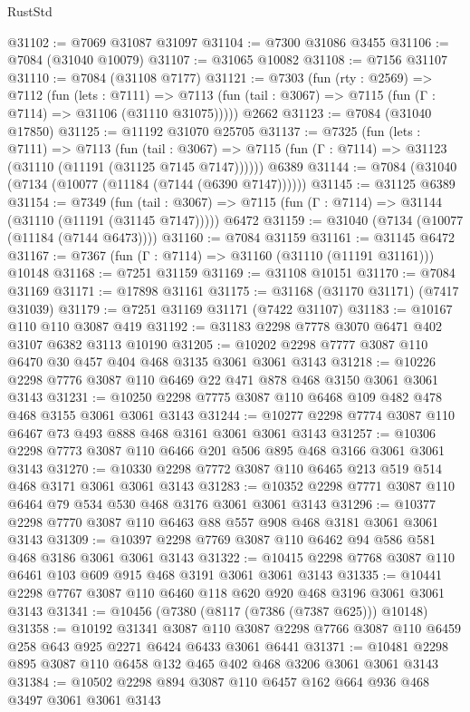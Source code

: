 \begin{lexlean}{RustStd}
\begin{coremodule}
@31102 := @7069 @31087 @31097
@31104 := @7300 @31086 @3455
@31106 := @7084 (@31040 @10079)
@31107 := @31065 @10082
@31108 := @7156 @31107
@31110 := @7084 (@31108 @7177)
@31121 := @7303
    (fun (rty : @2569) =>
    @7112
      (fun (lets : @7111) =>
      @7113 (fun (tail : @3067) => @7115 (fun (Γ : @7114) => @31106 (@31110 @31075)))))
    @2662
@31123 := @7084 (@31040 @17850)
@31125 := @11192 @31070 @25705
@31137 := @7325
    (fun (lets : @7111) =>
    @7113
      (fun (tail : @3067) =>
      @7115 (fun (Γ : @7114) => @31123 (@31110 (@11191 (@31125 @7145 @7147))))))
    @6389
@31144 := @7084 (@31040 (@7134 (@10077 (@11184 (@7144 (@6390 @7147))))))
@31145 := @31125 @6389
@31154 := @7349
    (fun (tail : @3067) => @7115 (fun (Γ : @7114) => @31144 (@31110 (@11191 (@31145 @7147)))))
    @6472
@31159 := @31040 (@7134 (@10077 (@11184 (@7144 @6473))))
@31160 := @7084 @31159
@31161 := @31145 @6472
@31167 := @7367 (fun (Γ : @7114) => @31160 (@31110 (@11191 @31161))) @10148
@31168 := @7251 @31159
@31169 := @31108 @10151
@31170 := @7084 @31169
@31171 := @17898 @31161
@31175 := @31168 (@31170 @31171) (@7417 @31039)
@31179 := @7251 @31169 @31171 (@7422 @31107)
@31183 := @10167 @110 @110 @3087 @419
@31192 := @31183 @2298 @7778 @3070 @6471 @402 @3107 @6382 @3113 @10190
@31205 := @10202 @2298 @7777 @3087 @110 @6470 @30 @457 @404 @468 @3135 @3061 @3061 @3143
@31218 := @10226 @2298 @7776 @3087 @110 @6469 @22 @471 @878 @468 @3150 @3061 @3061 @3143
@31231 := @10250 @2298 @7775 @3087 @110 @6468 @109 @482 @478 @468 @3155 @3061 @3061 @3143
@31244 := @10277 @2298 @7774 @3087 @110 @6467 @73 @493 @888 @468 @3161 @3061 @3061 @3143
@31257 := @10306 @2298 @7773 @3087 @110 @6466 @201 @506 @895 @468 @3166 @3061 @3061 @3143
@31270 := @10330 @2298 @7772 @3087 @110 @6465 @213 @519 @514 @468 @3171 @3061 @3061 @3143
@31283 := @10352 @2298 @7771 @3087 @110 @6464 @79 @534 @530 @468 @3176 @3061 @3061 @3143
@31296 := @10377 @2298 @7770 @3087 @110 @6463 @88 @557 @908 @468 @3181 @3061 @3061 @3143
@31309 := @10397 @2298 @7769 @3087 @110 @6462 @94 @586 @581 @468 @3186 @3061 @3061 @3143
@31322 := @10415 @2298 @7768 @3087 @110 @6461 @103 @609 @915 @468 @3191 @3061 @3061 @3143
@31335 := @10441 @2298 @7767 @3087 @110 @6460 @118 @620 @920 @468 @3196 @3061 @3061 @3143
@31341 := @10456 (@7380 (@8117 (@7386 (@7387 @625))) @10148)
@31358 := @10192
    @31341
    @3087
    @110
    @3087
    @2298
    @7766
    @3087
    @110
    @6459
    @258
    @643
    @925
    @2271
    @6424
    @6433
    @3061
    @6441
@31371 := @10481 @2298 @895 @3087 @110 @6458 @132 @465 @402 @468 @3206 @3061 @3061 @3143
@31384 := @10502 @2298 @894 @3087 @110 @6457 @162 @664 @936 @468 @3497 @3061 @3061 @3143

\end{coremodule}
\end{lexlean}
